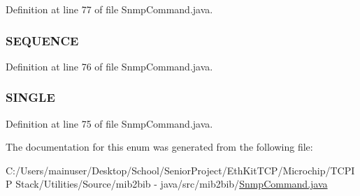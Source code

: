 Definition at line 77 of file Snmp\+Command.\+java.

\hypertarget{enummib2bib_1_1_snmp_command_1_1_o_i_d___t_y_p_e_a1a901676be44d13a4e77045512d9fb99}{}
\subsubsection[{S\+E\+Q\+U\+E\+N\+C\+E}]{\setlength{\rightskip}{0pt plus 5cm}S\+E\+Q\+U\+E\+N\+C\+E}\label{enummib2bib_1_1_snmp_command_1_1_o_i_d___t_y_p_e_a1a901676be44d13a4e77045512d9fb99}


Definition at line 76 of file Snmp\+Command.\+java.

\hypertarget{enummib2bib_1_1_snmp_command_1_1_o_i_d___t_y_p_e_a76b06276bbadc1b8d9e716c5d9326919}{}
\subsubsection[{S\+I\+N\+G\+L\+E}]{\setlength{\rightskip}{0pt plus 5cm}S\+I\+N\+G\+L\+E}\label{enummib2bib_1_1_snmp_command_1_1_o_i_d___t_y_p_e_a76b06276bbadc1b8d9e716c5d9326919}


Definition at line 75 of file Snmp\+Command.\+java.



The documentation for this enum was generated from the following file\+:\begin{DoxyCompactItemize}
\item 
C\+:/\+Users/mainuser/\+Desktop/\+School/\+Senior\+Project/\+Eth\+Kit\+T\+C\+P/\+Microchip/\+T\+C\+P\+I\+P Stack/\+Utilities/\+Source/mib2bib -\/ java/src/mib2bib/\hyperlink{_snmp_command_8java}{Snmp\+Command.\+java}\end{DoxyCompactItemize}
